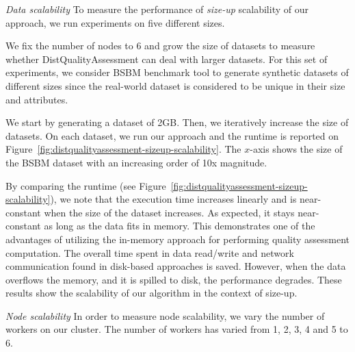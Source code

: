 \textit{Data scalability} 
To measure the performance of \textit{size-up} scalability of our approach, we run experiments on five different sizes.

We fix the number of nodes to 6 and grow the size of datasets to measure whether DistQualityAssessment can deal with larger datasets.
For this set of experiments, we consider BSBM benchmark tool to generate synthetic datasets of different sizes since the real-world dataset is considered to be unique in their size and attributes.

We start by generating a dataset of 2GB.
Then, we iteratively increase the size of datasets.
On each dataset, we run our approach and the runtime is reported on Figure~\ref{fig:distqualityassessment-sizeup-scalability}.
The $x$-axis shows the size of the BSBM dataset with an increasing order of 10x magnitude.

By comparing the runtime (see Figure~\ref{fig:distqualityassessment-sizeup-scalability}), we note that the execution time increases linearly and is near-constant when the size of the dataset increases.
As expected, it stays near-constant as long as the data fits in memory.
This demonstrates one of the advantages of utilizing the in-memory approach for performing quality assessment computation.
The overall time spent in data read/write and network communication found in disk-based approaches is saved.
However, when the data overflows the memory, and it is spilled to disk, the performance degrades.
These results show the scalability of our algorithm in the context of size-up.

\textit{Node scalability} In order to measure node scalability, we vary the number of workers on our cluster.
The number of workers has varied from 1, 2, 3, 4 and 5 to 6.


